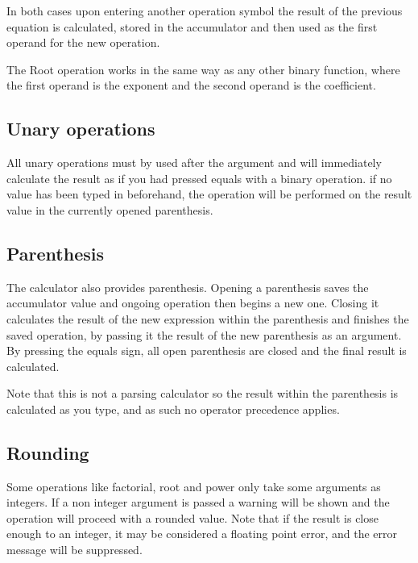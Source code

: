 \documentclass{article}
\begin{document}
	In both cases upon entering another operation symbol the result of the previous equation is calculated, stored in the accumulator and then used as the first operand for the new operation.
	
	The Root operation works in the same way as any other binary function, where the first operand is the exponent and the second operand is the coefficient. 
	
	\subsection{Unary operations}
	All unary operations must by used after the argument and will immediately calculate the result as if you had pressed equals with a binary operation. if no value has been typed in beforehand, the operation will be performed on the result value in the currently opened parenthesis.
	
	\subsection{Parenthesis}
	The calculator also provides parenthesis. Opening a parenthesis saves the accumulator value and ongoing operation then begins a new one. Closing it calculates the result of the new expression within the parenthesis and finishes the saved operation, by passing it the result of the new parenthesis as an argument. By pressing the equals sign, all open parenthesis are closed and the final result is calculated.
	
	Note that this is not a parsing calculator so the result within the parenthesis is calculated as you type, and as such no operator precedence applies.
	
	\subsection{Rounding}
	Some operations like factorial, root and power only take some arguments as integers.
	If a non integer argument is passed a warning will be shown and the operation will proceed with a rounded value. Note that if the result is close enough to an integer, it may be considered a floating point error, and the error message will be suppressed.\\
	
\end{document}
